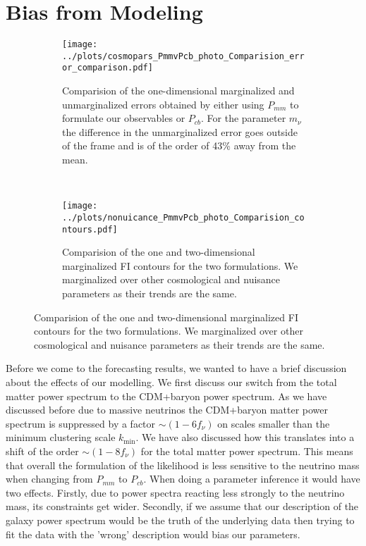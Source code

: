 \documentclass[../main.tex]{subfiles}
\begin{document}
\section{Bias from Modeling}
\begin{figure}
    \centering
    \caption{We show the effect of switching the formulation of our observables to use $P_{mm}$ instead of $P_{cb}$. We compare the results of the fisher forecast for the photometric optimistic using \cosmicfish:\class as our code.}
    \begin{subfigure}[b]{0.70\textwidth}
        \centering
        \texttt{[image: ../plots/cosmopars\_PmmvPcb\_photo\_Comparision\_error\_comparison.pdf]}
        \caption{Comparision of the one-dimensional marginalized and unmarginalized errors obtained by either using $P_{mm}$ to formulate our observables or $P_{cb}$. For the parameter $m_\nu$ the difference in the unmarginalized error goes outside of the frame and is of the order of 43\% away from the mean.}
        \label{fig:dotsPcbVPmm}
    \end{subfigure}
    \\
    \begin{subfigure}[b]{0.70\textwidth}
        \centering
        \texttt{[image: ../plots/nonuicance\_PmmvPcb\_photo\_Comparision\_contours.pdf]}
        \caption{Comparision of the one and two-dimensional marginalized FI contours for the two formulations. We marginalized over other cosmological and nuisance parameters as their trends are the same.}
        \label{fig:trianglePcbVPmm}
    \end{subfigure}
       \label{fig:PcbVPmm} 
\end{figure}
Before we come to the forecasting results, we wanted to have a brief discussion about the effects of our modelling. We first discuss our switch from the total matter power spectrum to the CDM+baryon power spectrum. As we have discussed before due to massive neutrinos the CDM+baryon matter power spectrum is suppressed by a factor $\sim(1-6f_\nu)$ on scales smaller than the minimum clustering scale $k_\mathrm{min}$. We have also discussed how this translates into a shift of the order $\sim(1-8f_\nu)$ for the total matter power spectrum. This means that overall the formulation of the likelihood is less sensitive to the neutrino mass when changing from $P_{mm}$ to $P_{cb}$. When doing a parameter inference it would have two effects. Firstly, due to power spectra reacting less strongly to the neutrino mass, its constraints get wider. Secondly, if we assume that our description of the galaxy power spectrum would be the truth of the underlying data then trying to fit the data with the 'wrong' description would bias our parameters.\\
\end{document}

